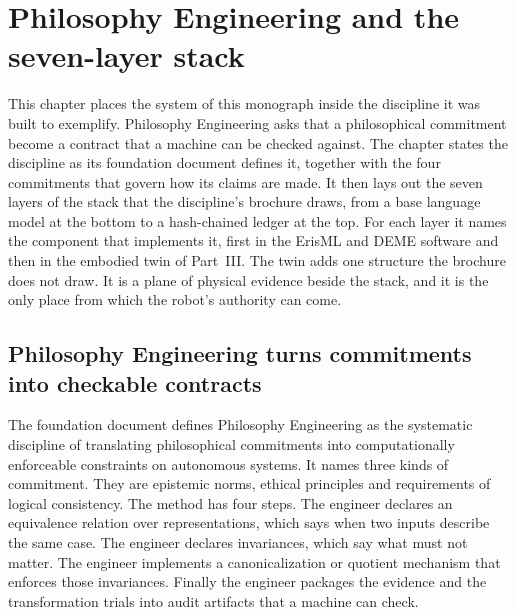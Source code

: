 \chapter{Philosophy Engineering and the seven-layer stack}\label{ch:pe}

This chapter places the system of this monograph inside the discipline it was built to exemplify.
Philosophy Engineering asks that a philosophical commitment become a contract that a machine can
be checked against. The chapter states the discipline as its foundation document defines it,
together with the four commitments that govern how its claims are made. It then lays out the
seven layers of the stack that the discipline's brochure draws, from a base language model at the
bottom to a hash-chained ledger at the top. For each layer it names the component that implements
it, first in the ErisML and DEME software and then in the embodied twin of Part~III. The twin adds
one structure the brochure does not draw. It is a plane of physical evidence beside the stack, and
it is the only place from which the robot's authority can come.

\section{Philosophy Engineering turns commitments into checkable contracts}\label{sec:pe-def}

The foundation document defines Philosophy Engineering as the systematic discipline of translating
philosophical commitments into computationally enforceable constraints on autonomous
systems.\cite{bond2026pefoundation}
It names three kinds of commitment. They are epistemic norms, ethical principles and requirements
of logical consistency.
The method has four steps.
The engineer declares an equivalence relation over representations, which says when two inputs
describe the same case. The engineer declares invariances, which say what must not matter. The
engineer implements a canonicalization or quotient mechanism that enforces those invariances.
Finally the engineer packages the evidence and the transformation trials into audit artifacts
that a machine can check.

